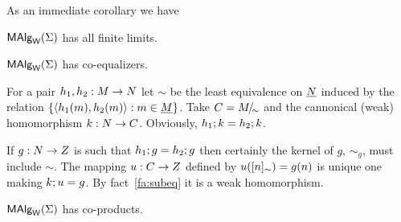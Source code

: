 \documentclass[10pt]{article}
\begin{document}

As an immediate corollary we have

\begin{Theorem}\label{th:MASlcmpl}
$\mbox{\rm\sf MAlg}_{\sf W}(\Sigma)$ has all finite limits.
\end{Theorem}

% 

\begin{Lemma}
\label{le:coeql}
$\mbox{\rm\sf MAlg}_{\sf W}(\Sigma)$ has co-equalizers.
\end{Lemma}

\begin{Proof}
For a pair $h_1,h_2:M\rightarrow N$ let $\sim$ be the least equivalence on
$\underline {N}$ induced by the relation $\{\langle h_1(m),h_2(m)\rangle:m\in\underline {M}\}$. Take $C=M\!{\textstyle /}\!_{\sim}$ and the cannonical (weak) homomorphism 
$k:N\rightarrow C$. Obviously,
$h_1;k=h_2;k$.

If $g:N\rightarrow Z$ is such that $h_1;g=h_2;g$ then certainly
the kernel of $g$, $\sim_g$, must include $\sim$. The mapping
$u:C\rightarrow Z$ defined by $u([n]_\sim)=g(n)$ is unique one making
$k;u=g$. By fact~\ref{fa:subeq} it is a weak homomorphism.
\end{Proof}

\begin{Lemma}
\label{le:MASlcopr}
$\mbox{\rm\sf MAlg}_{\sf W}(\Sigma)$ has co-products.
\end{Lemma}
\end{document}

